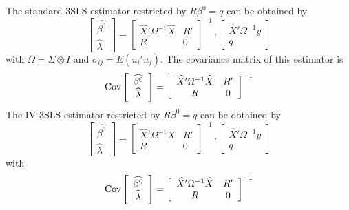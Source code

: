 The standard 3SLS estimator restricted by $R \beta^0 = q$ can be obtained by
\begin{equation}
   \left[ \begin{array}{c}
      \widehat{\beta^0} \\ \widehat{\lambda}
   \end{array} \right]
   =
   \left[ \begin{array}{cc}
      \widehat{X}' \Omega^{-1} \widehat{X} & R' \\ 
      R & 0
   \end{array} \right]^{-1}
   \cdot
   \left[ \begin{array}{c}
      \widehat{X}' \Omega^{-1} y \\ q 
   \end{array} \right]
   \label{eq:3slsGlsR}
\end{equation}
with $\Omega = \Sigma \otimes I$ and
$\sigma_{ij} = E \left( u_i' u_j \right)$.
The covariance matrix of this estimator is
\begin{equation}
   \text{Cov} 
   \left[ \begin{array}{c}
      \widehat{\beta^0} \\ \widehat{\lambda}
   \end{array} \right] 
   = 
   \left[ \begin{array}{cc}
      \widehat{X}' \Omega^{-1} \widehat{X} & R' \\ 
      R & 0
   \end{array} \right]^{-1}
   \label{eq:cov3slsr}
\end{equation}
The IV-3SLS estimator restricted by $R \beta^0 = q$ can be obtained by
\begin{equation}
   \left[ \begin{array}{c}
      \widehat{\beta^0} \\ \widehat{\lambda}
   \end{array} \right]
   =
   \left[ \begin{array}{cc}
      \widehat{X}' \Omega^{-1} X & R' \\ 
      R & 0
   \end{array} \right]^{-1}
   \cdot
   \left[ \begin{array}{c}
      \widehat{X}' \Omega^{-1} y \\ q 
   \end{array} \right]
   \label{eq:3slsIvR}
\end{equation}
with
\begin{equation}
   \text{Cov} 
   \left[ \begin{array}{c}
      \widehat{\beta^0} \\ \widehat{\lambda}
   \end{array} \right] 
   = 
   \left[ \begin{array}{cc}
      \widehat{X}' \Omega^{-1} \widehat{X} & R' \\ 
      R & 0
   \end{array} \right]^{-1}
\end{equation}
